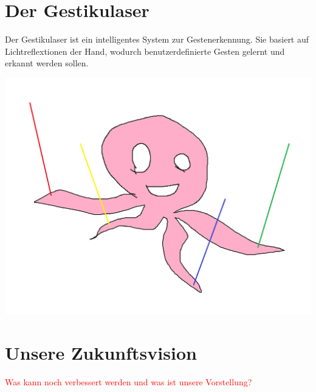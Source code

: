 \documentclass[a4paper,12pt,notumble]{leaflet}
\begin{document}
\newpage
\raggedright

\section{Der Gestikulaser}

Der Gestikulaser ist ein intelligentes System zur Gestenerkennung. Sie basiert auf Lichtreflextionen der Hand, wodurch benutzerdefinierte Gesten gelernt und erkannt werden sollen. 

\begin{flushright}
\includegraphics[scale=0.2]{../Logos/gestikulaser.png}
\end{flushright}

\newpage


\newpage
\thispagestyle{empty}
\quad 
\newpage

\section{Unsere Zukunftsvision}
\textcolor{red}{Was kann noch verbessert werden und was ist unsere Vorstellung?}
\end{document}
